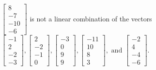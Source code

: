 \begin{exercise}
\begin{exerciseStatement}
  \end{exerciseStatement}
  \begin{exerciseAnswer}
   \(\left[\begin{array}{c}
8 \\
-7 \\
-10 \\
-6
\end{array}\right]\) 
  	 is not  
	a linear combination of the vectors \(\left[\begin{array}{c}
-1 \\
2 \\
-2 \\
-3
\end{array}\right] , \left[\begin{array}{c}
2 \\
-2 \\
-1 \\
0
\end{array}\right] , \left[\begin{array}{c}
-3 \\
0 \\
9 \\
9
\end{array}\right] , \left[\begin{array}{c}
-11 \\
10 \\
8 \\
3
\end{array}\right] , \text{ and } \left[\begin{array}{c}
-2 \\
4 \\
-4 \\
-6
\end{array}\right]\).

	
  


  \end{exerciseAnswer}
\end{exercise}
